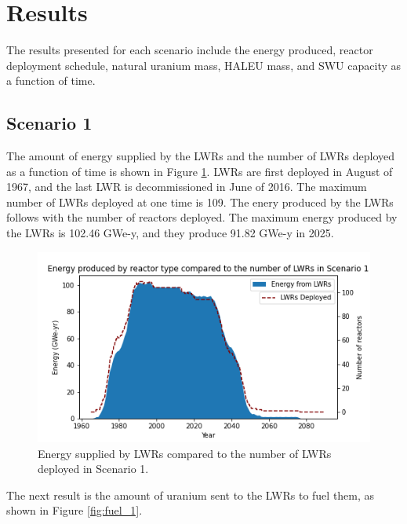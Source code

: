 \section{Results}
The results presented for each scenario include the energy produced, reactor 
deployment schedule, natural
uranium mass, \gls{HALEU} mass, and \gls{SWU} capacity as a function of time. 

\subsection{Scenario 1}
The amount of energy supplied by the \glspl{LWR} and the number of \glspl{LWR}
deployed as a function of time is shown in Figure \ref{fig:energy_rx_1}. 
\glspl{LWR} are first deployed in August of 1967, and the last 
\gls{LWR} is decommissioned in June of 2016. The maximum number of 
\glspl{LWR} deployed at one time is 109. The enery produced by the 
\glspl{LWR} follows with the number of reactors deployed. The maximum energy 
produced by the \glspl{LWR} is 102.46 GWe-y, and they produce 91.82 GWe-y 
in 2025.

\begin{figure}
    \centering 
    \includegraphics[scale=0.5]{figures/energy_scenario1.png}
    \caption{Energy supplied by \glspl{LWR} compared to the number of 
    \glspl{LWR} deployed in Scenario 1.}
    \label{fig:energy_rx_1}
\end{figure}

The next result is the amount of uranium sent to the \glspl{LWR} to fuel 
them, as shown in Figure \ref{fig:fuel_1}.

